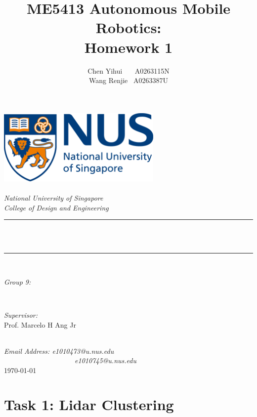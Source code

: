 \documentclass[10pt]{article}
\title{ME5413 Autonomous Mobile Robotics: \\ Homework 1}
\author{\textup{Chen Yihui \ \ \ A0263115N \\ Wang Renjie \ A0263387U }}
\theoremstyle{nonumberplain}
\begin{document}
	\begin{titlepage}
		\center
		\newcommand{\HRule}{\rule{\linewidth}{0.5mm}}
		\includegraphics[width=8cm]{logo.png}\\[1cm] 
		\quad\\[2cm]
		\textsl{\Large National University of Singapore}\\[0.5cm] 
		\textsl{\large College of Design and Engineering}\\[0.5cm]
		\makeatletter
		\HRule \\[0.4cm]
		{ \huge \bfseries \@title}\\[0.4cm] 
		\HRule \\[2cm]
		\begin{minipage}{0.4\textwidth}
			\begin{flushleft} \large
				\emph{Group 9:}\\
				\@author 
			\end{flushleft}
		\end{minipage}
		~
		\begin{minipage}{0.4\textwidth}
			\begin{flushright} \large
				\emph{Supervisor:} \\
				\textup{Prof. Marcelo H Ang Jr}
			\end{flushright}
		\end{minipage}\\[3cm]
		\makeatother
		{\large \emph{Email Address: e1010473@u.nus.edu \\	\ \ \ \ \ \ \ \ \ \ \ \ \ \ \ \ \ \ \ \ e1010745@u.nus.edu}}\\[0.5cm]
		{\large \today}\\[2cm] 
		\vfill 
	\end{titlepage}

\section{Task 1: Lidar Clustering}

\hspace{1.0em}
\end{document}
